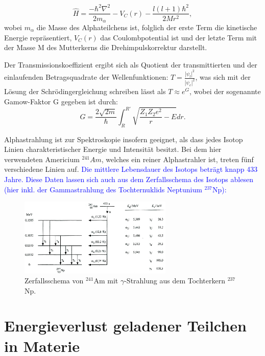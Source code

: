 \documentclass[bigchapter,colorback,accentcolor=tud4b,linedtoc,11pt]{tudreport}
\begin{document}
\color{blue}

$$\hat{H} = \frac{-\hbar^2 \nabla^2}{2 m_{\alpha}} - V_C(r) - \frac{l(l+1) \hbar^2}{2 M r^2},$$
wobei $m_{\alpha}$ die Masse des Alphateilchens ist, folglich der erste Term die kinetische Energie repräsentiert, $V_C(r)$ das Coulombpotential ist und der letzte Term mit der Masse M des Mutterkerns die Drehimpulskorrektur darstellt.

\color{black}

Der Transmissionskoeffizient ergibt sich als Quotient der transmittierten und der einlaufenden Betragsquadrate der Wellenfunktionen: $T = \frac{|\psi_t|^2}{|\psi_e|^2}$, was sich mit der Lösung der Schrödingergleichung schreiben lässt als $T \approx e^G$, wobei der sogenannte Gamow-Faktor G gegeben ist durch:
$$G = \frac{2 \sqrt{2 m}}{\hbar}\int_R^{R'} \sqrt{\frac{Z_1Z_2e^2}{r}-E} dr.$$

Alphastrahlung ist zur Spektroskopie insofern geeignet, als dass jedes Isotop Linien charakteristischer Energie und Intensität besitzt. Bei dem hier verwendeten Americium $^{241}Am$, welches ein reiner Alphastrahler ist, treten fünf verschiedene Linien auf. \textcolor{blue}{Die mittlere Lebensdauer des Isotops beträgt knapp 433 Jahre. Diese Daten lassen sich auch aus dem Zerfallsschema des Isotops ablesen (hier inkl. der Gammastrahlung des Tochternuklids Neptunium $^{237}$Np):}

\begin{figure}[H] 
  \centering
     \includegraphics[width=0.65\textwidth]{img/schema.png}
  \caption{Zerfallsschema von $^{241}$Am mit $\gamma$-Strahlung aus dem Tochterkern $^{237}$Np. \cite{website}}
  \label{fig:Bild1}
\end{figure}

\section{Energieverlust geladener Teilchen in Materie}
\end{document}
